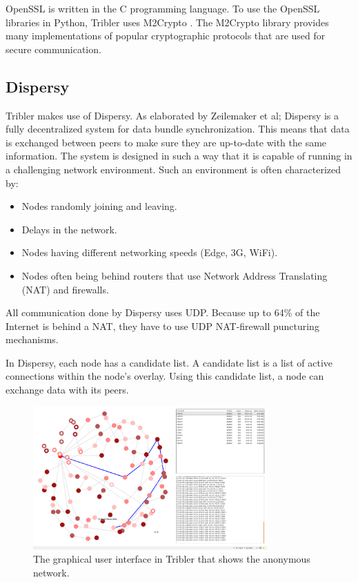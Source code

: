 		OpenSSL is written in the C programming language. To use the OpenSSL libraries in Python, Tribler uses M2Crypto \cite{m2cryptogithub}. The M2Crypto library provides many implementations of popular cryptographic protocols that are used for secure communication.
		
	\subsection{Dispersy}
	\label{sec:dispersy}
		Tribler makes use of Dispersy. As elaborated by Zeilemaker et al; Dispersy \cite{zeilemaker2013dispersy} is a fully decentralized system for data bundle synchronization. This means that data is exchanged between peers to make sure they are up-to-date with the same information. The system is designed in such a way that it is capable of running in a challenging network environment. Such an environment is often characterized by:
		\begin{itemize}
			\item Nodes randomly joining and leaving.
			\item Delays in the network.
			\item Nodes having different networking speeds (Edge, 3G, WiFi).
			\item Nodes often being behind routers that use Network Address Translating (NAT) and firewalls.
		\end{itemize}
		
		All communication done by Dispersy uses UDP. Because up to 64\% of the Internet is behind a NAT, they have to use UDP NAT-firewall puncturing mechanisms\cite{zeilemaker2013dispersy}.
		
		In Dispersy, each node has a candidate list. A candidate list is a list of active connections within the node's overlay. Using this candidate list, a node can exchange data with its peers.
		
		\begin{figure}[!t]
			\centering
			\includegraphics[width=0.8\textwidth]{prior-work/8hop.png}
			\caption{The graphical user interface in Tribler that shows the anonymous network.}
			\label{fig:anon_downloads}
		\end{figure}